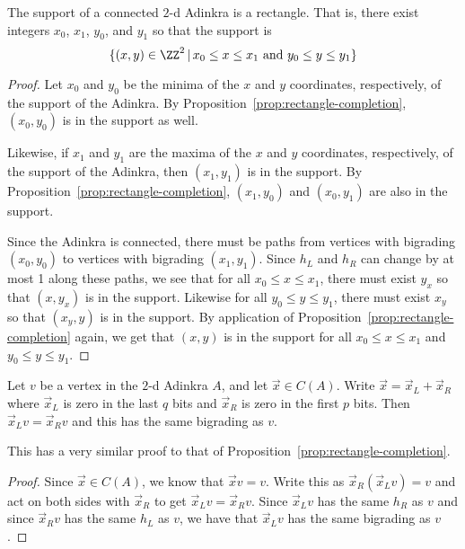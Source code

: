 \begin{cor}
\label{cor:rectangle}
The support of a connected $2$-d Adinkra is a rectangle.  That is, there exist integers $x_0$, $x_1$, $y_0$, and $y_1$ so that the support is
\[\{(x,y)\in\ZZ^2\,|\,x_0\le x\le x_1\mbox{ and }y_0\le y\le y_1\}\]
\end{cor}
\begin{proof}
Let $x_0$ and $y_0$ be the minima of the $x$ and $y$ coordinates, respectively, of the support of the Adinkra.  By Proposition~\ref{prop:rectangle-completion}, $(x_0,y_0)$ is in the support as well.

Likewise, if $x_1$ and $y_1$ are the maxima of the $x$ and $y$ coordinates, respectively, of the support of the Adinkra, then $(x_1,y_1)$ is in the support.  By Proposition~\ref{prop:rectangle-completion}, $(x_1,y_0)$ and $(x_0,y_1)$ are also in the support.

Since the Adinkra is connected, there must be paths from vertices with bigrading $(x_0,y_0)$ to vertices with bigrading $(x_1,y_1)$.  Since $h_L$ and $h_R$ can change by at most 1 along these paths, we see that for all $x_0\le x\le x_1$, there must exist $y_x$ so that $(x,y_x)$ is in the support.  Likewise for all $y_0\le y\le y_1$, there must exist $x_y$ so that $(x_y,y)$ is in the support.  By application of Proposition~\ref{prop:rectangle-completion} again, we get that $(x,y)$ is in the support for all $x_0\le x\le x_1$ and $y_0\le y\le y_1$.
\end{proof}

\begin{prop}
\label{prop:heightcode}
Let $v$ be a vertex in the $2$-d Adinkra $A$, and let $\vec{x}\in C(A)$.  Write $\vec{x}=\vec{x}_L+\vec{x}_R$ where $\vec{x}_L$ is zero in the last $q$ bits and $\vec{x}_R$ is zero in the first $p$ bits.  Then $\vec{x}_L v=\vec{x}_R v$ and this has the same bigrading as $v$.
\end{prop}
This has a very similar proof to that of Proposition~\ref{prop:rectangle-completion}.

\begin{proof}
Since $\vec{x}\in C(A)$, we know that $\vec{x}v=v$.  Write this as $\vec{x}_R(\vec{x}_L v)=v$ and act on both sides with $\vec{x}_R$ to get $\vec{x}_L v = \vec{x}_R v$.  Since $\vec{x}_L v$ has the same $h_R$ as $v$ and since $\vec{x}_R v$ has the same $h_L$ as $v$, we have that $\vec{x}_L v$ has the same bigrading as $v$.
\end{proof}

